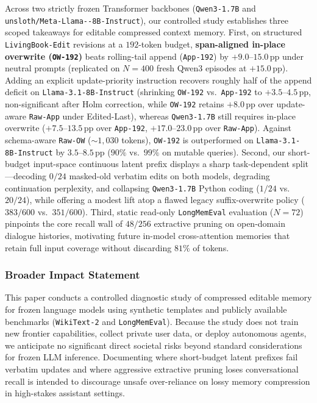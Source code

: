 \documentclass[10pt]{article}
\newcommand{\pp}{\,\text{pp}}
\renewcommand{\_}{\origunderscore\allowbreak}
\begin{document}
Across two strictly frozen Transformer backbones (\texttt{Qwen3-1.7B} and \texttt{unsloth/\allowbreak Meta-\allowbreak Llama--8B-Instruct}), our controlled study establishes three scoped takeaways for editable compressed context memory. First, on structured \texttt{LivingBook-Edit} revisions at a $192$-token budget, \textbf{span-aligned in-place overwrite (\texttt{OW-192})} beats rolling-tail append (\texttt{App-192}) by $+9.0$--$15.0\pp$ under neutral prompts (replicated on $N=400$ fresh Qwen3 episodes at $+15.0\pp$). Adding an explicit update-priority instruction recovers roughly half of the append deficit on \texttt{Llama-3.1-8B-Instruct} (shrinking \texttt{OW-192} vs.\ \texttt{App-192} to $+3.5$--$4.5\pp$, non-significant after Holm correction, while \texttt{OW-192} retains $+8.0\pp$ over update-aware \texttt{Raw-App} under Edited-Last), whereas \texttt{Qwen3-1.7B} still requires in-place overwrite ($+7.5$--$13.5\pp$ over \texttt{App-192}, $+17.0$--$23.0\pp$ over \texttt{Raw-App}). Against schema-aware \texttt{Raw-OW} ($\sim 1{,}030$ tokens), \texttt{OW-192} is outperformed on \texttt{Llama-3.1-8B-Instruct} by $3.5$--$8.5\pp$ ($90\%$ vs.\ $99\%$ on mutable queries). Second, our short-budget input-space continuous latent prefix displays a sharp task-dependent split---decoding $0/24$ masked-old verbatim edits on both models, degrading continuation perplexity, and collapsing \texttt{Qwen3-1.7B} Python coding ($1/24$ vs.\ $20/24$), while offering a modest lift atop a flawed legacy suffix-overwrite policy ($383/600$ vs.\ $351/600$). Third, static read-only \texttt{LongMemEval} evaluation ($N=72$) pinpoints the core recall wall of $48/256$ extractive pruning on open-domain dialogue histories, motivating future in-model cross-attention memories that retain full input coverage without discarding $81\%$ of tokens.

\subsubsection*{Broader Impact Statement}
This paper conducts a controlled diagnostic study of compressed editable memory for frozen language models using synthetic templates and publicly available benchmarks (\texttt{WikiText-2} and \texttt{LongMemEval}). Because the study does not train new frontier capabilities, collect private user data, or deploy autonomous agents, we anticipate no significant direct societal risks beyond standard considerations for frozen LLM inference. Documenting where short-budget latent prefixes fail verbatim updates and where aggressive extractive pruning loses conversational recall is intended to discourage unsafe over-reliance on lossy memory compression in high-stakes assistant settings.
\end{document}
